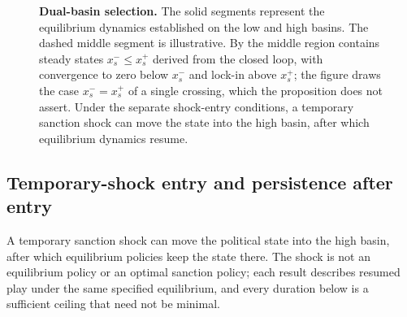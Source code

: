 \begin{figure}[tbp]
\centering
{}
\caption{\textbf{Dual-basin selection.}
The solid segments represent the equilibrium dynamics established on the
low and high basins. The dashed middle segment is illustrative. By
 the middle region contains steady states
$x_s^-\le x_s^+$ derived from the closed loop, with convergence to zero below $x_s^-$ and
lock-in above $x_s^+$; the figure draws the case $x_s^-=x_s^+$ of a single
crossing, which the proposition does not assert. Under
the separate shock-entry conditions, a temporary sanction
shock can move the state into the high basin, after which equilibrium
dynamics resume.}
\label{fig:bistability}
\end{figure}

\subsection{Temporary-shock entry and persistence after entry}
\label{sec:counterfactual}

A temporary sanction shock can move the political state into the high
basin, after which equilibrium policies keep the state there. The
shock is not an equilibrium policy or an optimal sanction policy; each result
describes resumed play under the same specified equilibrium, and every
duration below is a sufficient ceiling that need not be minimal.

